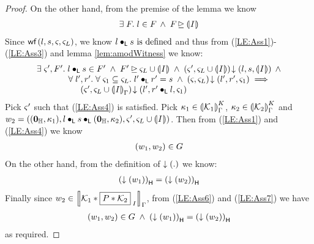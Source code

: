 \begin{lemma}[]
\begin{proof}
On the other hand, from the premise of the lemma we know 
%
\begin{align}
	\exsts{\fence{}} l \in \fence{} \;\land\; \fence{} \strictfences \intermediateSemI{I} \label{LE:Ass3}
\end{align}
Since $\wf{l, s, \amod{}, \amod{L}}$, we know $l \composeL s \text{ is defined}$ and thus from (\ref{LE:Ass1})-(\ref{LE:Ass3}) and lemma \ref{lem:amodWitness} we know:
%
\begin{align}
\begin{array}{l}
	\exsts{\amod{}', \fence{}'} l \composeL s \in \fence{}' \;\land\; \fence{}' \strictfences \amod{L} \cup \intermediateSemI{I} \;\land\; \extendsAM{\amod{}', \amod{L} \cup \intermediateSemI{I}}{l}{s}{\intermediateSemI{I}} \;\land\\
	\hspace*{1.3cm}\for{l', r'} \for{\amod{1} \subseteq \amod{L}} l' \composeL r' = s \;\land\; \extendsAM{\amod{}, \amod{L}}{l'}{r'}{\amod{1}} \implies\\
	\hspace*{1.8cm}\extendsAM{\amod{}', \amod{L} \cup \intermediateSem{I}}{l'}{r' \composeL l}{\amod{1}} 
\end{array}\label{LE:Ass4}
\end{align}
%
Pick $\amod{}'$ such that (\ref{LE:Ass4}) is satisfied. Pick $\ca{1} \in \semK[\lenv]{\capAss{1}}$, $\ca{2} \in \semK[\lenv]{\capAss{2}}$ and $w_2 = ( (\unitH, \ca{1}), l \composeL s \composeL (\unitH, \ca{2}), \amod{}', \amod{L} \cup \intermediateSemI{I} )$. Then from (\ref{LE:Ass1}) and (\ref{LE:Ass4}) we know
%
\begin{align}
	(w_1, w_2) \in \guarantee \label{LE:Ass6}
\end{align}
%
On the other hand, from the definition of $\collapseW{.}$ we know:
\begin{align}
	\heapPart{\left(\collapseW{w_1}\right)} = \heapPart{\left(\collapseW{w_2}\right)} \label{LE:Ass7}
\end{align}
%
Finally since $w_2 \in \sem[\lenv]{\capAss{1} * \shared{P * \capAss{2}}{I}}$, from (\ref{LE:Ass6}) and (\ref{LE:Ass7}) we have
%
\begin{align}
	(w_1, w_2) \in \guarantee \;\land\; \heapPart{\left(\collapseW{w_1}\right)} = \heapPart{\left(\collapseW{w_2}\right)}
\end{align}
%
as required.
\end{proof}
\end{lemma}
